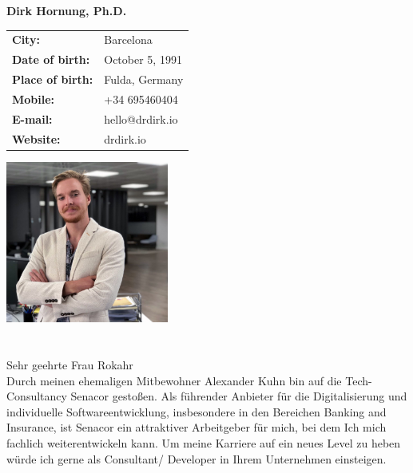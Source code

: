 \documentclass[11pt]{article}
\begin{document}
\Large
\noindent
\textbf{Dirk Hornung, Ph.D.} \\

\normalsize
\noindent
\begin{minipage}{0.5\linewidth}
  \begin{tabularx}{0.6\textwidth}{>{\bfseries}l l}
    City:           & Barcelona \\
    Date of birth:  & October 5, 1991\\
    Place of birth: & Fulda, Germany \\
    Mobile:         & +34 695460404 \\
    E-mail:         & hello@drdirk.io \\
    Website:      	& drdirk.io
  \end{tabularx}
\end{minipage}
\begin{minipage}{0.5\linewidth}
  \begin{flushright}
    \includegraphics[width=0.4\textwidth]{dirk.png}
  \end{flushright}
\end{minipage}

 \section*{}
 \vspace{1cm}
 Sehr geehrte Frau Rokahr \\

 \noindent Durch meinen ehemaligen Mitbewohner Alexander Kuhn bin auf die
 Tech-Consultancy Senacor gestoßen. Als führender Anbieter für die
 Digitalisierung und individuelle Softwareentwicklung, insbesondere in den
 Bereichen Banking and Insurance, ist Senacor ein attraktiver Arbeitgeber für
 mich, bei dem Ich mich fachlich weiterentwickeln kann. Um meine Karriere auf
 ein neues Level zu heben würde ich gerne als Consultant/ Developer in Ihrem
 Unternehmen einsteigen. \\
\end{document}
